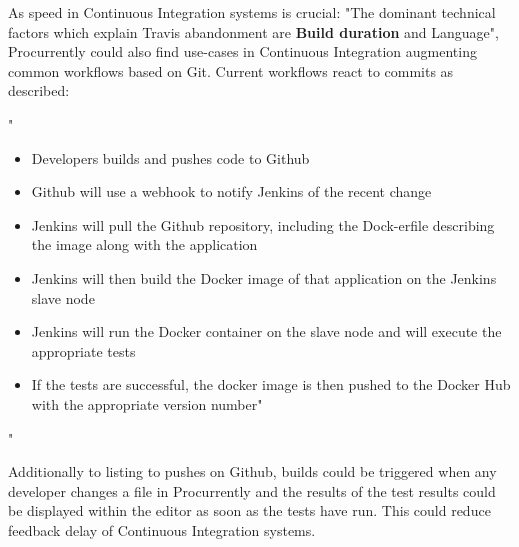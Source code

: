 As speed in Continuous Integration systems is crucial: "The dominant technical factors which explain Travis abandonment are \textbf{Build duration} and Language"\cite{8595199}, Procurrently could also find use-cases in Continuous Integration augmenting common workflows based on Git. 
Current workflows react to commits as described:

"
\begin{itemize}
    \item Developers builds and pushes code to Github
    \item Github will use a webhook to notify Jenkins of the recent change
    \item Jenkins will pull the Github repository, including the Dock-erfile describing the image along with the application
    \item Jenkins will then build the Docker image of that application on the Jenkins slave node
    \item Jenkins will run the Docker container on the slave node and will execute the appropriate tests
    \item If the tests are successful, the docker image is then pushed to the Docker Hub with the appropriate version number"
\end{itemize}
"\cite{8695332}

Additionally to listing to pushes on Github, builds could be triggered when any developer changes a file in Procurrently and the results of the test results could be displayed within the editor as soon as the tests have run. This could reduce feedback delay of Continuous Integration systems.